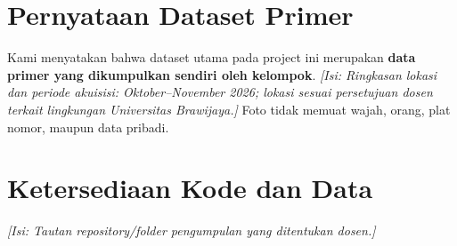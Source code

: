 \documentclass[10pt,twocolumn,a4paper]{article}
\newcommand{\isian}[1]{\textcolor{notegray}{\textit{[Isi: #1]}}}
\begin{document}
\section*{Pernyataan Dataset Primer}
Kami menyatakan bahwa dataset utama pada project ini merupakan \textbf{data primer yang dikumpulkan sendiri oleh kelompok}. \isian{Ringkasan lokasi dan periode akuisisi: Oktober--November 2026; lokasi sesuai persetujuan dosen terkait lingkungan Universitas Brawijaya.} Foto tidak memuat wajah, orang, plat nomor, maupun data pribadi.

\section*{Ketersediaan Kode dan Data}
\isian{Tautan repository/folder pengumpulan yang ditentukan dosen.}



\end{document}
